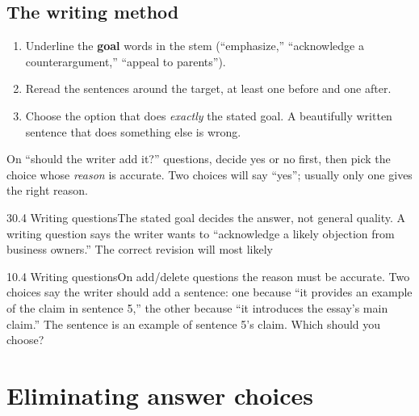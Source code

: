 \documentclass[11pt]{article}
\begin{document}
\subsection{The writing method}
\begin{enumerate}[leftmargin=1.5em]
\item Underline the \textbf{goal} words in the stem (``emphasize,'' ``acknowledge a counterargument,'' ``appeal to parents'').
\item Reread the sentences around the target, at least one before and one after.
\item Choose the option that does \emph{exactly} the stated goal. A beautifully written sentence that does something else is wrong.
\end{enumerate}

\begin{trap}
On ``should the writer add it?'' questions, decide yes or no first, then pick the choice whose \emph{reason} is accurate. Two choices will say ``yes''; usually only one gives the right reason.
\end{trap}

\begin{q}{3}{0.4 Writing questions}{The stated goal decides the answer, not general quality.}
A writing question says the writer wants to ``acknowledge a likely objection from business owners.'' The correct revision will most likely
\end{q}

\begin{q}{1}{0.4 Writing questions}{On add/delete questions the reason must be accurate.}
Two choices say the writer should add a sentence: one because ``it provides an example of the claim in sentence 5,'' the other because ``it introduces the essay's main claim.'' The sentence is an example of sentence 5's claim. Which should you choose?
\end{q}

\section{Eliminating answer choices}
\end{document}
